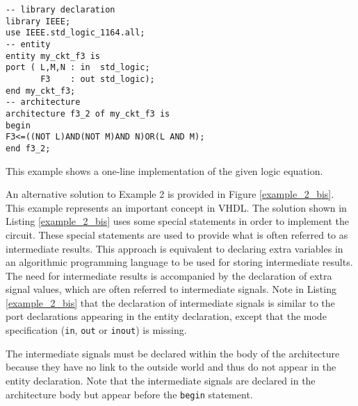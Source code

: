 \noindent
\begin{minipage}{0.57\linewidth}
\begin{lstlisting}[label=example_2, caption=Solution of Example 2.]
-- library declaration
library IEEE;
use IEEE.std_logic_1164.all;
-- entity
entity my_ckt_f3 is
port ( L,M,N : in  std_logic;
       F3    : out std_logic);
end my_ckt_f3;
-- architecture
architecture f3_2 of my_ckt_f3 is
begin
F3<=((NOT L)AND(NOT M)AND N)OR(L AND M);
end f3_2;
\end{lstlisting}
\end{minipage}
\begin{minipage}{0.4\linewidth}
\begin{flushright}
\end{flushright}
\end{minipage}

This example shows a one-line implementation of the given logic equation.

An alternative solution to Example 2 is provided in Figure \ref{example_2_bis}. This example represents an important concept in VHDL. The solution shown in Listing \ref{example_2_bis} uses some special statements in order to implement the circuit. These special statements are used to provide what is often referred to as intermediate results. This approach is equivalent to declaring extra variables in an algorithmic programming language to be used for storing intermediate results. The need for intermediate results is accompanied by the declaration of extra signal values, which are often referred to intermediate signals. Note in Listing \ref{example_2_bis} that the declaration of intermediate signals is similar to the port declarations appearing in the entity declaration, except that the mode specification (\texttt{in}, \texttt{out} or \texttt{inout}) is missing. 

The intermediate signals must be declared within the body of the architecture because they have no link to the outside world and thus do not appear in the entity declaration. Note that the intermediate signals are declared in the architecture body but appear before the \texttt{begin} statement.

